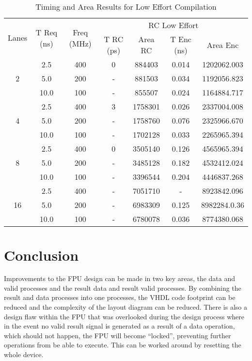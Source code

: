 \documentclass[conference]{IEEEtran}
\begin{document}
\begin{table}[!t]
	\renewcommand{\arraystretch}{1.3}
	\caption{Timing and Area Results for Low Effort Compilation }
	\label{table_example2}
	\centering
	\begin{tabular}{|c|c|c|c|c|c|c|}
		\hline
		\multirow{3}{*}{Lanes} & \multirow{3}{0.8cm}{T Req (ns)} &\multirow{3}{0.7cm}{Freq (MHz)} & \multicolumn{4}{|c|}{RC Low Effort}\\  \cline{4-7}
		&&&\multirow{2}{0.7cm}{T RC (ps)} & \multirow{2}{0.8cm}{Area RC} & \multirow{2}{0.8cm}{T Enc (ns)} & \multirow{2}{0.8cm}{Area Enc}\\
		&&&&&&\\
		\hline
		\multirow{3}{*}{2}&2.5&400&0&884403&0.014&1202062.003\\
		\cline{2-7}
		&5.0&200&-&881503&0.034&1192056.823\\
		\cline{2-7}
		&10.0&100&-&855507&0.024&1164884.717\\
		\hline
		\multirow{3}{*}{4}&2.5&400&3&1758301&0.026&2337004.008\\
		\cline{2-7}
		&5.0&200&-&1758760&0.076&2325966.670\\
		\cline{2-7}
		&10.0&100&-&1702128&0.033&2265965.394\\
		\hline
		\multirow{3}{*}{8}&2.5&400&0&3505140&0.126&4565965.394\\
		\cline{2-7}
		&5.0&200&-&3485128&0.182&4532412.024\\
		\cline{2-7}
		&10.0&100&-&3396544&0.204&4446837.268\\
		\hline
		\multirow{3}{*}{16}&2.5&400&-&7051710&-&8923842.096\\
		\cline{2-7}
		&5.0&200&-&6983309&0.125&8982284.0.36\\
		\cline{2-7}
		&10.0&100&-&6780078&0.036&8774380.068\\
		\hline
	\end{tabular}
\end{table}




\section{Conclusion}
Improvements to the FPU design can be made in two key areas, the data and valid processes and the result data and result valid processes. By combining the result and data processes into one processes, the VHDL code footprint can be reduced and the complexity of the layout diagram can be reduced. There is also a design flaw within the FPU that was overlooked during the design process where in the event no valid result signal is generated as a result of a data operation, which should not happen, the FPU will become “locked”, preventing further operations from be able to execute. This can be worked around by resetting the whole device. 
\newline
\end{document}
